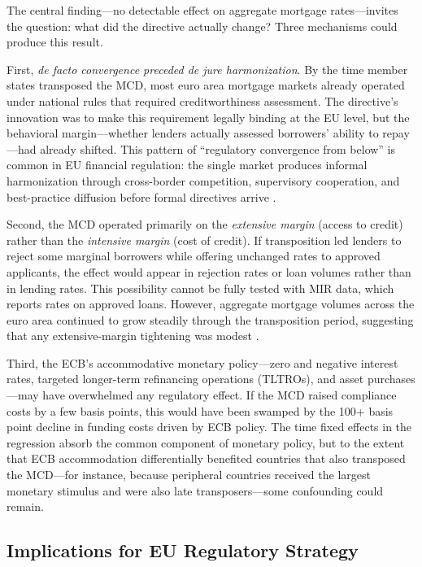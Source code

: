 \documentclass[12pt]{article}
\begin{document}
The central finding---no detectable effect on aggregate mortgage rates---invites the question: what did the directive actually change? Three mechanisms could produce this result.

First, \textit{de facto convergence preceded de jure harmonization}. By the time member states transposed the MCD, most euro area mortgage markets already operated under national rules that required creditworthiness assessment. The directive's innovation was to make this requirement legally binding at the EU level, but the behavioral margin---whether lenders actually assessed borrowers' ability to repay---had already shifted. This pattern of ``regulatory convergence from below'' is common in EU financial regulation: the single market produces informal harmonization through cross-border competition, supervisory cooperation, and best-practice diffusion before formal directives arrive \citep{enriques_2015_eu_finance, ferran_2014_single_rulebook}.

Second, the MCD operated primarily on the \textit{extensive margin} (access to credit) rather than the \textit{intensive margin} (cost of credit). If transposition led lenders to reject some marginal borrowers while offering unchanged rates to approved applicants, the effect would appear in rejection rates or loan volumes rather than in lending rates. This possibility cannot be fully tested with MIR data, which reports rates on approved loans. However, aggregate mortgage volumes across the euro area continued to grow steadily through the transposition period, suggesting that any extensive-margin tightening was modest \citep{ecb_lending_survey_2019}.

Third, the ECB's accommodative monetary policy---zero and negative interest rates, targeted longer-term refinancing operations (TLTROs), and asset purchases---may have overwhelmed any regulatory effect. If the MCD raised compliance costs by a few basis points, this would have been swamped by the 100+ basis point decline in funding costs driven by ECB policy. The time fixed effects in the regression absorb the common component of monetary policy, but to the extent that ECB accommodation differentially benefited countries that also transposed the MCD---for instance, because peripheral countries received the largest monetary stimulus and were also late transposers---some confounding could remain.

\subsection{Implications for EU Regulatory Strategy}
\end{document}
